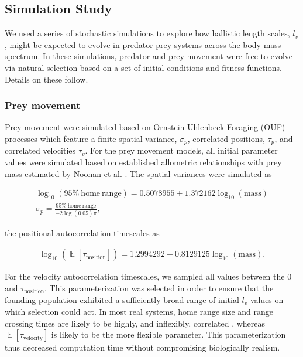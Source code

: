 \documentclass[12pt]{article}
\DeclareMathOperator{\E}{\mathbb{E}}
\begin{document}
\subsection*{Simulation Study}

We used a series of stochastic simulations to explore how ballistic length scales, $l_v$, might be expected to evolve in predator prey systems across the body mass spectrum. In these simulations, predator and prey movement were free to evolve via natural selection based on a set of initial conditions and fitness functions. Details on these follow.

\subsubsection*{Prey movement}

Prey movement were simulated based on Ornstein-Uhlenbeck-Foraging (OUF) processes \cite{Fleming:2014jr,Fleming:2014gd} which feature a finite spatial variance, $\sigma_p$, correlated positions, $\tau_p$, and correlated velocities $\tau_v$. For the prey movement models, all initial parameter values were simulated based on established allometric relationships with prey mass estimated by Noonan et al. \cite{Noonan:2020}. The spatial variances were simulated as

\begin{gather}
\log_{10}(\mathrm{95\%~home~range}) = 0.5078955 + 1.372162 \log_{10}(\mathrm{mass}) \\
\sigma_p = \frac{\mathrm{95\%~home~range}}{-2 \log(0.05)  \pi},
\end{gather}

the positional autocorrelation timescales as

\begin{gather}
\log_{10}(\E[\tau_\mathrm{position}]) = 1.2994292 + 0.8129125 \log_{10}(\mathrm{mass}).
\end{gather}

For the velocity autocorrelation timescales, we sampled all values between the 0 and $\tau_\mathrm{position}$. This parameterization was selected in order to ensure that the founding population exhibited a sufficiently broad range of initial $l_v$ values on which selection could act. In most real systems, home range size and range crossing times are likely to be highly, and inflexibly, correlated \cite{Noonan:2020}, whereas $\E[\tau_\mathrm{velocity}]$ is likely to be the more flexible parameter. This parameterization thus decreased computation time without compromising biologically realism.
\end{document}

